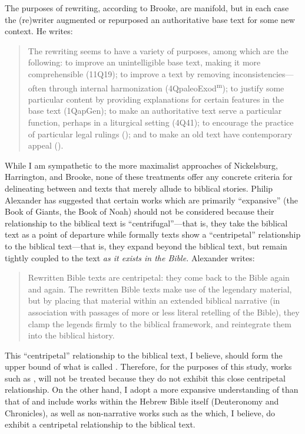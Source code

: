 The purposes of rewriting, according to Brooke, are manifold, but in each case the (re)writer augmented or repurposed an authoritative base text for some new context. He writes: 

\begin{quote}
    The rewriting seems to have a variety of purposes, among which are the following: to improve an unintelligible base text, making it more comprehensible (11Q19); to improve a text by removing inconsistencies---often through internal harmonization (4QpaleoExod\textsuperscript{m}); to justify some particular content by providing explanations for certain features in the base text (1QapGen); to make an authoritative text serve a particular function, perhaps in a liturgical setting (4Q41); to encourage the practice of particular legal rulings (\jub); and to make an old text have contemporary appeal (\templescroll).\autocite[778]{brooke_schiffman-vanderkam2000}
\end{quote} 

While I am sympathetic to the more maximalist approaches of Nickelsburg, Harrington, and Brooke, none of these treatments offer any concrete criteria for delineating between \rwb and texts that merely allude to biblical stories. Philip Alexander has suggested that certain works which are primarily ``expansive'' (the Book of Giants, the Book of Noah) should not be considered \rwb because their relationship to the biblical text is ``centrifugal''---that is, they take the biblical text as a point of departure while formally \rwb texts show a ``centripetal'' relationship to the biblical text---that is, they expand beyond the biblical text, but remain tightly coupled to the text \emph{as it exists in the Bible.} Alexander writes: 

\begin{quote}
    Rewritten Bible texts are centripetal: they come back to the Bible again and again. The rewritten Bible texts make use of the legendary material, but by placing that material within an extended biblical narrative (in association with passages of more or less literal retelling of the Bible), they clamp the legends firmly to the biblical framework, and reintegrate them into the biblical history. \autocite[117]{alexander_carson-williamson1988}
\end{quote} 

This ``centripetal'' relationship to the biblical text, I believe, should form the upper bound of what is called \rwb. Therefore, for the purposes of this study, works such as \firstenoch, will not be treated because they do not exhibit this close centripetal relationship. On the other hand, I adopt a more expansive understanding of \rwb than that of \vermes and include works within the Hebrew Bible itself (Deuteronomy and Chronicles), as well as non-narrative works such as the \templescroll which, I believe, do exhibit a centripetal relationship to the biblical text. 


